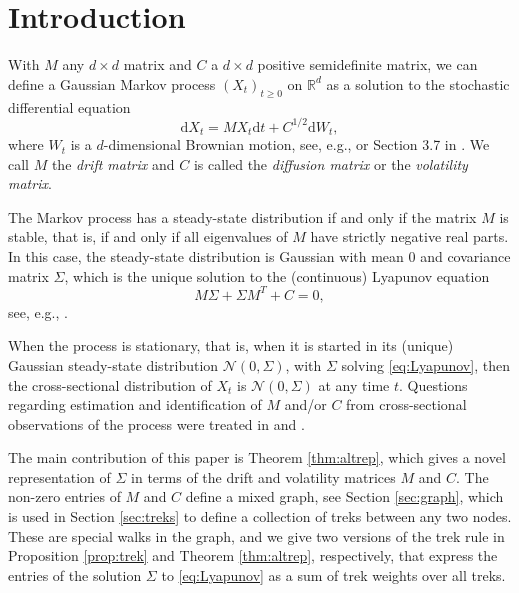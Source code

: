 \documentclass[10pt,twoside,a4paper]{amsart}
\begin{document}
\section{Introduction}

With $M$ any $d \times d$ matrix and $C$ a $d \times d$ 
positive semidefinite matrix, we can define a Gaussian Markov process $(X_t)_{t \geq 0}$ 
on $\mathbb{R}^d$ as a solution to the stochastic differential equation
\begin{equation} \label{eq:SDE}
\mathrm{d}X_t = MX_t \mathrm{d}t + C^{1/2} \mathrm{d}W_t,
\end{equation}
where $W_t$ is a $d$-dimensional Brownian motion, see, e.g.,  
\cite{Jacobsen:1993} or Section 3.7 in \cite{Pavliotis:2014}.
We call $M$ the 
\emph{drift matrix} and $C$ is called the \emph{diffusion matrix} or the 
\emph{volatility matrix}.

The Markov process has 
a steady-state distribution if and only if the matrix $M$ is stable, 
that is, if and only if all eigenvalues of $M$ have strictly negative
real parts. In this case, the steady-state distribution is Gaussian with mean
$0$ and covariance matrix $\Sigma$, which is the unique
solution to the (continuous) Lyapunov equation
\begin{equation} \label{eq:Lyapunov}
M\Sigma + \Sigma M^T + C = 0,
\end{equation}
see, e.g., \cite[Theorem 2.12]{Jacobsen:1993}.

When the process is stationary, that is, when it is started in its (unique)
Gaussian steady-state distribution $\mathcal{N}(0, \Sigma)$, with $\Sigma$
solving \eqref{eq:Lyapunov}, then the cross-sectional distribution of $X_t$ is
$\mathcal{N}(0, \Sigma)$ at any time $t$. Questions regarding estimation and
identification of $M$ and/or $C$ from cross-sectional observations of the
process were treated in \cite{varando2020} and \cite{Dettling:2023}.

The main contribution of this paper is Theorem \ref{thm:altrep}, which gives a
novel representation of $\Sigma$ in terms of the drift and volatility matrices
$M$ and $C$.  The non-zero entries 
 of $M$ and $C$ define a mixed graph, see Section \ref{sec:graph}, 
 which is used in Section \ref{sec:treks} to define a collection of treks between any two nodes. These are special walks in the graph, 
 and we give two versions of the trek rule in 
 Proposition \ref{prop:trek} and Theorem \ref{thm:altrep}, respectively, that 
 express
 the entries of the solution $\Sigma$ to \eqref{eq:Lyapunov} as a sum 
 of trek weights over all treks. 
 
\end{document}

